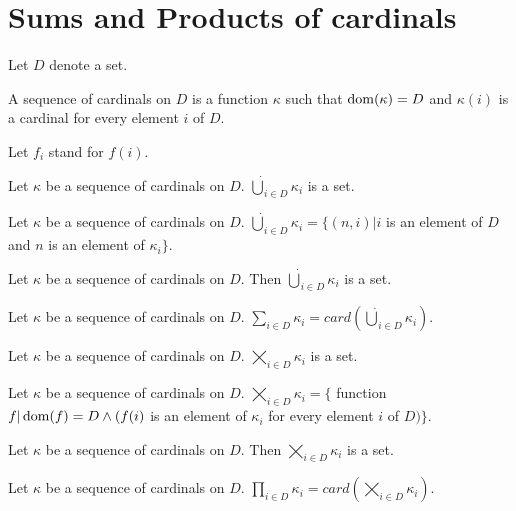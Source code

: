 \documentclass{article}
\newcommand{\val}[2]{#1_{#2}}
\begin{document}
\section{Sums and Products of cardinals}

\newcommand{\SumSet}[2]{{\dot{\bigcup}}_{i \in #2} \val{#1}{i}}
\newcommand{\Sum}[2]{{\sum}_{i \in #2} \val{#1}{i}}
\newcommand{\ProdSet}[2]{{\bigtimes}_{i \in #2} \val{#1}{i}}
\newcommand{\Prod}[2]{{\prod}_{i \in #2} \val{#1}{i}}

  \begin{forthel}
    Let $D$ denote a set.

    \begin{definition}
      A sequence of cardinals on $D$ is a function $\kappa$ 
      such that $\operatorname{dom}(\kappa) = D$ 
      and $\kappa(i)$ is a cardinal for every element $i$ of $D$.
    \end{definition}

Let $\val{f}{i}$ stand for $f(i)$.

    \begin{signature}
      Let $\kappa$ be a sequence of cardinals on $D$. 
     $\SumSet{\kappa}{D}$ is a set.
    \end{signature}

    \begin{axiom}[SumDef]
      Let $\kappa$ be a sequence of cardinals on $D$. $\SumSet{\kappa}{D} = 
      \{(n,i) | i$ is an element of $D$ and $n$ is an element 
      of $\val{\kappa}{i}\}$.
    \end{axiom}

    \begin{axiom}
      Let $\kappa$ be a sequence of cardinals on $D$. 
      Then $\SumSet{\kappa}{D}$ is a set.
    \end{axiom}

    \begin{definition}
      Let $\kappa$ be a sequence of cardinals on $D$. 
      $\Sum{\kappa}{D} = card(\SumSet{\kappa}{D})$.
    \end{definition}

    \begin{signature}
      Let $\kappa$ be a sequence of cardinals on $D$. 
      $\ProdSet{\kappa}{D}$ is a set.
    \end{signature}

    \begin{axiom}[ProdDef]
      Let $\kappa$ be a sequence of cardinals on $D$. $\ProdSet{\kappa}{D} = 
      \{$ function $f | \operatorname{dom}(f) = D \wedge (f(i)$ is an element of 
      $\val{\kappa}{i}$ for every
      element $i$ of $D)\}$.
    \end{axiom}

    \begin{axiom}
      Let $\kappa$ be a sequence of cardinals on $D$. 
      Then $\ProdSet{\kappa}{D}$ is a set.
    \end{axiom}

    \begin{definition}
      Let $\kappa$ be a sequence of cardinals on $D$. 
      $\Prod{\kappa}{D} = card(\ProdSet{\kappa}{D})$.
    \end{definition}
\end{forthel}
\end{document}
